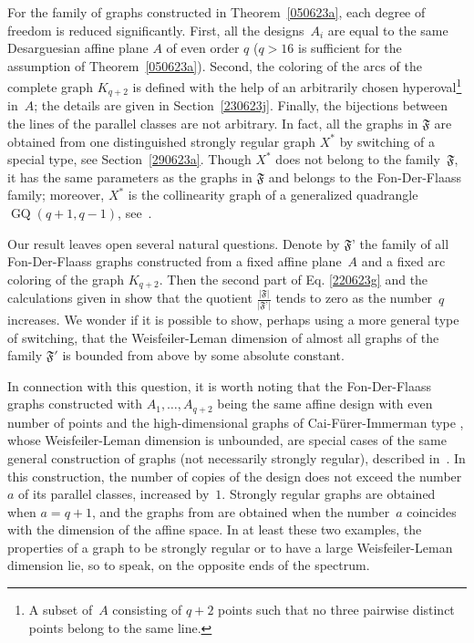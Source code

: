 \documentclass{amsart}
\def\fF{{\mathfrak F}}
\DeclareMathOperator{\GQ}{GQ}
\begin{document}
For the family of graphs constructed in Theorem~\ref{050623a}, 
each degree of freedom is reduced significantly. First, all the designs~$A_i$ are equal to the same Desarguesian affine plane $A$ of even order $q$ ($q>16$ is sufficient for the assumption of Theorem~\ref{050623a}).
Second, the coloring of the arcs of the complete graph $K_{q+2}$ is defined with the help of an arbitrarily chosen hyperoval\footnote{A subset of~$A$ consisting  of $q+2$ points  such that no three pairwise distinct points belong to the same line.} in~$A$; the details are given in Section~\ref{230623j}. Finally, the bijections between the lines 
of the parallel classes are not arbitrary. In fact, all the graphs in $\fF$ are obtained from one distinguished strongly regular graph $X^*$ by switching of a special type, see Section~\ref{290623a}. Though $X^*$ does not belong to the family~$\fF$, it has the same parameters as the graphs in $\fF$ and belongs to the Fon-Der-Flaass family; moreover, $X^*$ is the collinearity graph of 
a generalized quadrangle $\GQ(q+1,q-1)$, 
see~\cite[Example~10.18] {KissS2020}. 

Our result leaves open several natural questions. 
Denote by $\fF’$ the family of all Fon-Der-Flaass graphs constructed from a fixed affine plane~$A$ and a fixed arc coloring of the graph $K_{q+2}$. Then the second part of  Eq. \eqref{220623g} and the calculations given in \cite[Proposition~3.5]{Muzychuk2009F} show that the quotient $\frac{|\fF|}{|\fF’|}$ tends to zero as the number~$q$ increases. 
We wonder if it is possible to show, perhaps using a more general type of switching, that the Weisfeiler-Leman dimension of almost all graphs of the family  $\fF'$ is bounded from above by some absolute constant.

In connection with this question, it is worth noting that the Fon-Der-Flaass graphs constructed with $A_1,\ldots,A_{q+2}$ being the same affine design with even number of points and the high-dimensional graphs 
of Cai-F\"urer-Immerman type \cite{Fuhlbr2021}, 
whose Weisfeiler-Leman dimension is unbounded, 
are special cases of the same general  construction of graphs 
(not necessarily strongly regular), described in~\cite[Section~3]{Muzychuk2009F}. In this construction, the number of copies of 
the design does not exceed the number $a$ of its parallel classes, increased by~$1$. Strongly regular graphs are obtained when $a=q+1$, and the graphs from \cite{Fuhlbr2021}  are obtained when the number~$a$ coincides with the dimension of the affine space. In at least these two examples, the properties of a graph to be strongly regular or to have a large Weisfeiler-Leman dimension lie, so to speak, on the opposite ends of the spectrum.
\end{document}
